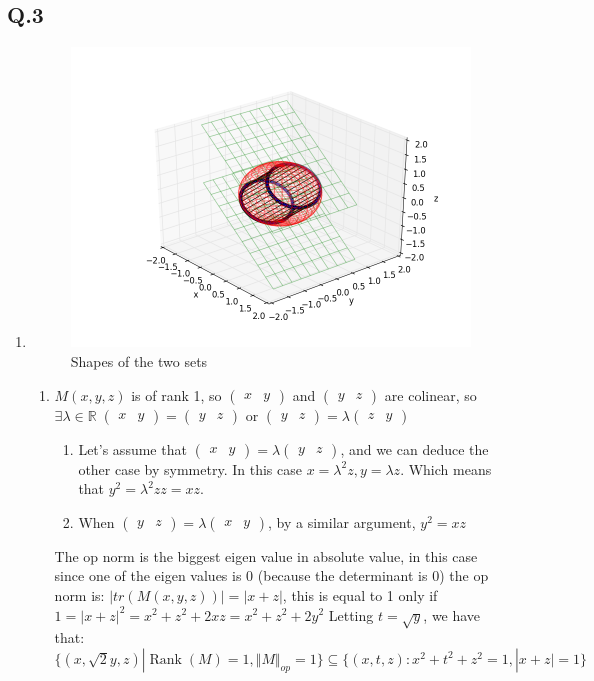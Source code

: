 \documentclass[12pt]{article}
\newcommand{\Q}[1]{\subsection*{Q.#1}}
\newenvironment{question}[1]
{\Q{#1}}{}
\newcommand{\row}[2]{\begin{pmatrix}#1 & #2\end{pmatrix}}
\DeclareMathOperator{\rank}{Rank}
\begin{document}
\begin{question}{3}
  \begin{enumerate}
  \item 

    \begin{figure}[ht]
      \centering
      \includegraphics[scale=0.4]{nucnormset1.png}
      \caption{\label{fig:q3} Shapes of the two sets}
    \end{figure}

    \begin{enumerate}
    \item
      $M(x,y,z)$ is of rank 1, so $\row{x}{y}$ and $\row{y}{z}$ are colinear, so  $ \exists \lambda  \in \mathbb{R} \; \row{x}{y} = \row{y}{z} \text{ or } \row{y}{z} = \lambda \row{z}{y}$
      \begin{enumerate}
      \item Let's assume that $\row{x}{y} = \lambda \row{y}{z}$, and we can
        deduce the other case by symmetry.  In this case
        $x = \lambda^2 z, y = \lambda z$. Which means that $y^2 = \lambda^2z z = xz$.
      \item When $\row{y}{z} = \lambda \row{x}{y}$, by a similar argument, $y^2 = xz$
      \end{enumerate}
      The op norm is the biggest eigen value in absolute value, in this case since one of the
      eigen values is 0 (because the determinant is 0) the op norm is:
      $|tr(M(x, y, z))| = |x + z|$, this is equal to 1 only if $1 = |x+z|^2 = x^2 + z^2 + 2xz = x^2 + z^2 + 2y^2$
      Letting $t = \sqrt y$, we have that:
      $\{ (x, \sqrt2 y, z) | \rank(M) = 1, \Vert M\Vert _{op} = 1 \} \subseteq \{ (x, t, z): x^2 + t^2 + z^2 = 1, |x+z|=1  \} $


\end{enumerate}
\end{enumerate}
\end{question}
\end{document}

